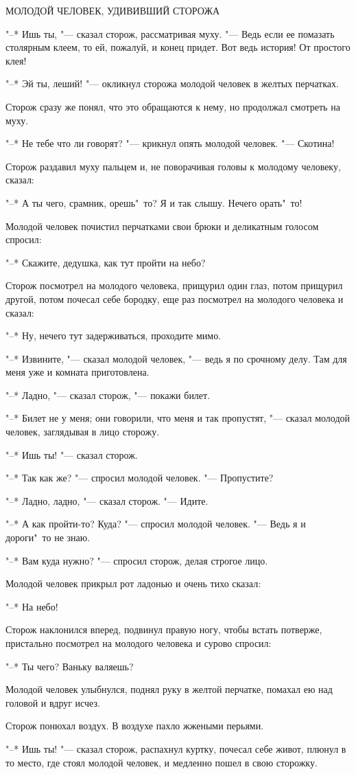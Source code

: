 МОЛОДОЙ  ЧЕЛОВЕК, УДИВИВШИЙ СТОРОЖА 

    "--* Ишь ты, "--- сказал сторож,  рассматривая 
муху. "--- Ведь если ее помазать столярным клеем, 
то ей, пожалуй, и конец придет. Вот ведь
история! От простого клея! 

    "--* Эй ты, леший! "--- окликнул сторожа молодой 
человек в желтых перчатках.

    Сторож сразу же понял, что это обращаются 
к нему, но продолжал смотреть на
муху. 

    "--* Не  тебе что  ли  говорят?  "---  крикнул
опять молодой человек. "--- Скотина! 

    Сторож раздавил муху пальцем и, не поворачивая 
головы к молодому человеку, сказал:

    "--* А ты чего, срамник, орешь"~то?  Я и так
слышу. Нечего орать"~то! 

    Молодой человек почистил перчатками свои
брюки и деликатным голосом спросил:

    "--* Скажите,  дедушка,  как  тут пройти на
небо? 

    Сторож  посмотрел  на молодого человека,
прищурил один глаз,  потом  прищурил другой,
потом почесал  себе бородку, еще раз посмотрел 
на молодого человека и сказал: 

    "--* Ну, нечего тут задерживаться, проходите мимо. 

    "--* Извините, "---  сказал молодой человек, "---
ведь я по срочному делу. Там для меня  уже и
комната приготовлена. 

    "--* Ладно,  "---  сказал сторож, "--- покажи билет. 

    "--* Билет не у меня; они говорили, что меня 
и так пропустят, "--- сказал  молодой  человек, 
заглядывая в лицо сторожу. 

    "--* Ишь ты! "--- сказал сторож. 

    "--* Так как же? "--- спросил молодой человек.
"--- Пропустите? 

    "--* Ладно, ладно, "--- сказал сторож. "---  Идите. 

    "--* А как пройти-то? Куда? "--- спросил молодой 
человек. "--- Ведь я и дороги"~то не знаю. 

    "--* Вам куда нужно? "--- спросил сторож, делая строгое лицо. 

    Молодой  человек  прикрыл  рот ладонью и
очень тихо сказал: 

    "--* На небо! 

    Сторож наклонился вперед, подвинул  правую 
ногу, чтобы  встать потверже, пристально
посмотрел  на  молодого  человека  и  сурово
спросил: 

    "--* Ты чего? Ваньку валяешь? 

    Молодой человек улыбнулся, поднял руку в
желтой  перчатке,  помахал  ею над головой и
вдруг исчез. 

    Сторож понюхал воздух.  В  воздухе пахло
жжеными перьями.

    "--* Ишь  ты!  "---  сказал  сторож, распахнул
куртку, почесал себе живот, плюнул в то место,  
где стоял молодой  человек,  и медленно
пошел в свою сторожку.